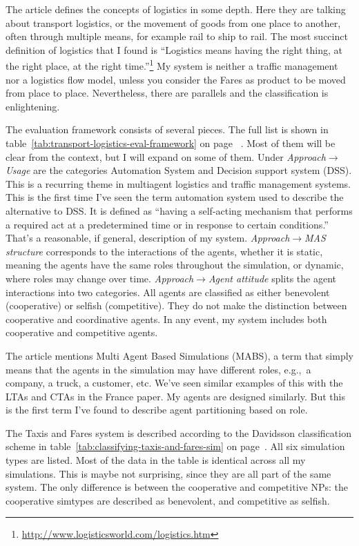 \documentclass[11pt,letterpaper,onecolumn,twoside,openright,final]{report}
\begin{document}
The article defines the concepts of logistics in some depth.
Here they are talking about transport logistics, or the movement of goods from one place to another, often through multiple means, for example rail to ship to rail.
The most succinct definition of logistics that I found is ``Logistics means having the right thing, at the right place, at the right time.''\footnote{\url{http://www.logisticsworld.com/logistics.htm}}
My system is neither a traffic management nor a logistics flow model, unless you consider the Fares as product to be moved from place to place.
Nevertheless, there are parallels and the classification is enlightening.

The evaluation framework consists of several pieces.
The full list is shown in table~\ref{tab:transport-logistics-eval-framework} on page~\pageref{tab:transport-logistics-eval-framework}
.
Most of them will be clear from the context, but I will expand on some of them.
Under \emph{Approach}$\to$\emph{Usage} are the categories Automation System and Decision support system (DSS).
This is a recurring theme in multiagent logistics and traffic management systems.
This is the first time I've seen the term automation system used to describe the alternative to DSS.
It is defined as ``having a self-acting mechanism that performs a required act at a predetermined time or in response to certain conditions.''
That's a reasonable, if general, description of my system.
\emph{Approach}$\to$\emph{MAS structure} corresponds to the interactions of the agents, whether it is static, meaning the agents have the same roles throughout the simulation, or dynamic, where roles may change over time.
\emph{Approach}$\to$\emph{Agent attitude} splits the agent interactions into two categories.
All agents are classified as either benevolent (cooperative) or selfish (competitive).
They do not make the distinction between cooperative and coordinative agents.
In any event, my system includes both cooperative and competitive agents.

The article mentions Multi Agent Based Simulations (MABS), a term that simply means that the agents in the simulation may have different roles, e.g.,~a company, a truck, a customer, etc.
We've seen similar examples of this with the LTAs and CTAs in the France paper.
My agents are designed similarly.
But this is the first term I've found to describe agent partitioning based on role.

The Taxis and Fares system is described according to the Davidsson classification scheme in table~\ref{tab:classifying-taxis-and-fares-sim} on page~\pageref{tab:classifying-taxis-and-fares-sim}.
All six simulation types are listed.
Most of the data in the table is identical across all my simulations.
This is maybe not surprising, since they are all part of the same system.
The only difference is between the cooperative and competitive NPs: the cooperative simtypes are described as benevolent, and competitive as selfish.
\end{document}
